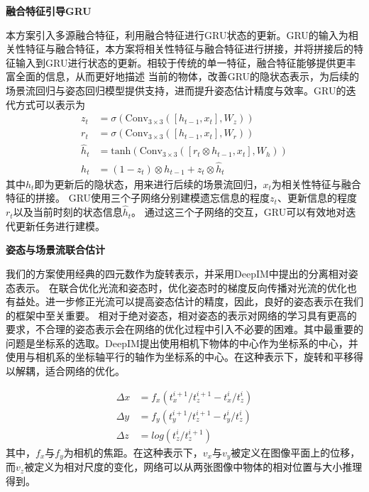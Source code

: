 \documentclass[12pt]{article}
\begin{document}
\textbf{融合特征引导GRU}

本方案引入多源融合特征，利用融合特征进行GRU状态的更新。GRU的输入为相关性特征与融合特征，本方案将相关性特征与融合特征进行拼接，并将拼接后的特征输入到GRU进行状态的更新。相较于传统的单一特征，融合特征能够提供更丰富全面的信息，从而更好地描述
当前的物体，改善GRU的隐状态表示，为后续的场景流回归与姿态回归模型提供支持，进而提升姿态估计精度与效率。GRU的迭代方式可以表示为
\begin{equation}
    \begin{aligned}
        z_t &= \sigma(\mathrm{Conv}_{3\times3}([h_{t-1}, x_t], W_z)) \\
        r_t &= \sigma(\mathrm{Conv}_{3\times3}([h_{t-1}, x_t], W_r)) \\
        \hat{h}_t &= \mathrm{tanh}(\mathrm{Conv}_{3\times3}([r_t \otimes h_{t-1}, x_t], W_h)) \\
        h_t &= (1 - z_t)\otimes h_{t-1} + z_t \otimes \hat{h}_t
    \end{aligned}
\end{equation}
其中$h_t$即为更新后的隐状态，用来进行后续的场景流回归，$x_t$为相关性特征与融合特征的拼接。
GRU使用三个子网络分别建模遗忘信息的程度$z_t$、更新信息的程度$r_t$以及当前时刻的状态信息$\hat{h}_t$。
通过这三个子网络的交互，GRU可以有效地对迭代更新任务进行建模。

\textbf{姿态与场景流联合估计}

我们的方案使用经典的四元数作为旋转表示，并采用DeepIM中提出的分离相对姿态表示。
在联合优化光流和姿态时，优化姿态时的梯度反向传播对光流的优化也有益处。进一步修正光流可以提高姿态估计的精度，因此，良好的姿态表示在我们的框架中至关重要。
相对于绝对姿态，相对姿态的表示对网络的学习具有更高的要求，不合理的姿态表示会在网络的优化过程中引入不必要的困难。其中最重要的问题是坐标系的选取。DeepIM提出使用相机下物体的中心作为坐标系的中心，并使用与相机系的坐标轴平行的轴作为坐标系的中心。在这种表示下，旋转和平移得以解耦，适合网络的优化。

\begin{equation}
    \begin{aligned}
    \Delta x & = f_x(t_x^{i+1}/t_z^{i+1} - t_x^i/t_z^i)\\
    \Delta y & = f_y(t_y^{i+1}/t_z^{i+1} - t_y^i/t_z^i) \\
    \Delta z & = log(t_z^i/t_z^{i+1})
\end{aligned}
\end{equation}
其中，$f_x$与$f_y$为相机的焦距。在这种表示下，$v_x$与$v_y$被定义在图像平面上的位移，而$v_z$被定义为相对尺度的变化，网络可以从两张图像中物体的相对位置与大小推理得到。
\end{document}

